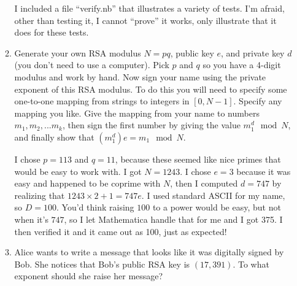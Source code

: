 \documentclass[a4paper,12pt]{article}
\begin{document}
\begin{enumerate}
\begin{enumerate}
    I included a file ``verify.nb'' that illustrates a variety of tests. I'm afraid, other than testing it, I cannot ``prove'' it works, only illustrate that it does for these tests.
    \item Generate your own RSA modulus $N = pq$, public key $e$, and private key $d$ (you don't need to use a computer). Pick $p$ and $q$ so you have a 4-digit modulus and work by hand. Now sign your name using the private exponent of this RSA modulus. To do this you will need to specify some one-to-one mapping from strings to integers in $[0,N - 1]$. Specify any mapping you like. Give the mapping from your name to numbers $m_1,m_2,...m_k$, then sign the first number by giving the value $m_1^d \mod N$, and finally show that $(m_1^d)e = m_1 \mod N$.

    \vspace{5mm}

    I chose $p = 113$ and $q = 11$, because these seemed like nice primes that would be easy to work with. I got $N = 1243$. I chose $e = 3$ because it was easy and happened to be coprime with $N$, then I computed $d = 747$ by realizing that $1243 \times 2 + 1 = 747e$. I used standard ASCII for my name, so $D = 100$. You'd think raising $100$ to a power would be easy, but not when it's $747$, so I let Mathematica handle that for me and I got 375. I then verified it and it came out as 100, just as expected!

    \item Alice wants to write a message that looks like it was digitally signed by Bob. She notices that Bob's public RSA key is $(17,391)$. To what exponent should she raise her message? 
\end{enumerate}

\end{enumerate}
\end{document}
